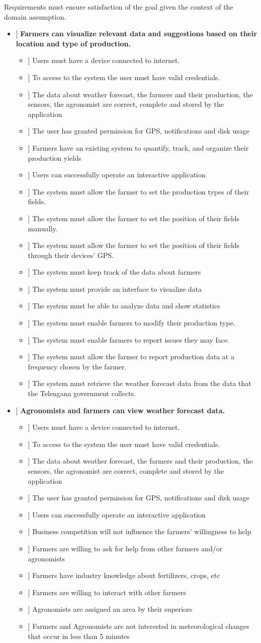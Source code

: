 \newcommand\goal[1]{\item[[ G#1]]}
\newcommand\dom[1]{\item[[ D#1]]}
\newcommand\req[1]{\item[[ R#1]]}

Requirements must ensure satisfaction of the goal given the context of the domain assumption.


\begin{itemize}
\goal{1} \textbf{Farmers can visualize relevant data and suggestions based on their location and type of production.}

\begin{itemize}
\dom{1}  Users must have a device connected to internet.
\dom{2} To access to the system the user must have valid credentials.
\dom{3} The data about weather forecast, the farmers and their production, the sensors, the agronomist are correct, complete and stored by the application
\dom{4} The user has granted permission for GPS, notifications and disk usage
\dom{5} Farmers have an existing system to quantify, track, and organize their production yields
\dom{6} Users can successfully operate an interactive application

\req{1} The system must allow the farmer to set the production types of their fields.
\req{2} The system must allow the farmer to set the position of their fields manually.
\req{3} The system must allow the farmer to set the position of their fields through their devices' GPS.
\req{4} The system must keep track of the data about farmers
\req{5} The system must provide an interface to visualize data
\req{6} The system must be able to analyze data and show statistics
\req{7} The system must enable farmers to modify their production type.
\req{8} The system must enable farmers to report issues they may face.
\req{9} The system must allow the farmer to report production data at a frequency chosen by the farmer.
\req{10} The system must retrieve the weather forecast data from the data that the Telengana government collects.
\end{itemize}

\goal{2}  \textbf{Agronomists and farmers can view weather forecast data.}

\begin{itemize}
\dom{1}  Users must have a device connected to internet.
\dom{2} To access to the system the user must have valid credentials.
\dom{3} The data about weather forecast, the farmers and their production, the sensors, the agronomist are correct, complete and stored by the application
\dom{4} The user has granted permission for GPS, notifications and disk usage
\dom{6} Users can successfully operate an interactive application
\dom{7} Business competition will not influence the farmers' willingness to help
\dom{8} Farmers are willing to ask for help from other farmers and/or agronomists
\dom{9} Farmers have industry knowledge about fertilizers, crops, etc 
\dom{10} Farmers are willing to interact with other farmers 
\dom{12} Agronomists are assigned an area by their superiors
\dom{16} Farmers and Agronomists are not interested in meteorological changes that occur in less than 5 minutes


\end{itemize}
\end{itemize}
